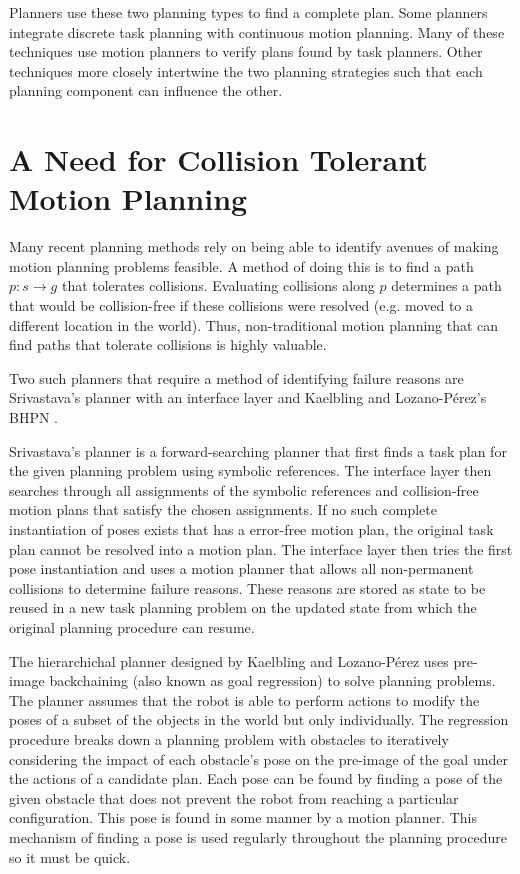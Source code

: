 Planners use these two planning types to find a complete plan. Some planners integrate discrete task planning with continuous motion planning. Many of these techniques use motion planners to verify plans found by task planners. Other techniques more closely intertwine the two planning strategies such that each planning component can influence the other. 

\section{A Need for Collision Tolerant Motion Planning} \label{intro:collisiontolerant}
Many recent planning methods rely on being able to identify avenues of making motion planning problems feasible. A method of doing this is to find a path $p:s \rightarrow g$ that tolerates collisions. Evaluating collisions along $p$ determines a path that would be collision-free if these collisions were resolved (e.g. moved to a different location in the world). Thus, non-traditional motion planning that can find paths that tolerate collisions is highly valuable. 

Two such planners that require a method of identifying failure reasons are Srivastava's planner with an interface layer and Kaelbling and Lozano-P\'{e}rez's BHPN \cite{srivastava:interface} \cite{kaelbling_tlp:preimage}. 

Srivastava's planner is a forward-searching planner that first finds a task plan for the given planning problem using symbolic references. The interface layer then searches through all assignments of the symbolic references and collision-free motion plans that satisfy the chosen assignments. If no such complete instantiation of poses exists that has a error-free motion plan, the original task plan cannot be resolved into a motion plan. The interface layer then tries the first pose instantiation and uses a motion planner that allows all non-permanent collisions to determine failure reasons. These reasons are stored as state to be reused in a new task planning problem on the updated state from which the original planning procedure can resume. 

The hierarchichal planner designed by Kaelbling and Lozano-P\'{e}rez uses pre-image backchaining (also known as goal regression) to solve planning problems. The planner assumes that the robot is able to perform actions to modify the poses of a subset of the objects in the world but only individually. The regression procedure breaks down a planning problem with obstacles to iteratively considering the impact of each obstacle's pose on the pre-image of the goal under the actions of a candidate plan. Each pose can be found by finding a pose of the given obstacle that does not prevent the robot from reaching a particular configuration. This pose is found in some manner by a motion planner. This mechanism of finding a pose is used regularly throughout the planning procedure so it must be quick.

